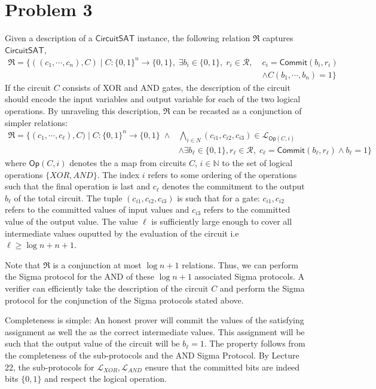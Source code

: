 \documentclass[12pt]{article}%
\begin{document}
\section*{Problem 3}
Given a description of a $\mathsf{CircuitSAT}$ instance, the following relation $\mathfrak{R}$ captures $\mathsf{CircuitSAT}$,
\begin{align*}
  \mathfrak{R} = \{ ((c_1,\cdots,c_n), C) \mid C:\{0,1\}^n \rightarrow \{0,1\}, \; \exists b_i \in \{0,1\}, \; r_i \in \mathcal{R}, \; & c_i = \mathsf{Commit}(b_i,r_i) \\
  & \wedge C(b_1,\cdots,b_n) = 1 \}
\end{align*}
If the circuit $C$ consists of XOR and AND gates, the description of the circuit should encode the input variables and output variable for each of the two logical operations. By unraveling this description, $\mathfrak{R}$ can be recasted as a conjunction of simpler relations:
\begin{align*}
  \mathfrak{R} = \{ (c_1,\cdots,c_\ell), C) \mid C:\{0,1\}^n \rightarrow \{0,1\}\;
   \wedge & \bigwedge_{i \in N} (c_{i1}, c_{i2}, c_{i3}) \in \mathcal{L}_{\mathsf{Op}(C, i)} \\
    & \wedge \exists b_\ell \in \{0,1\}, r_\ell \in \mathcal{R}, \; c_\ell = \mathsf{Commit}(b_\ell, r_\ell) \wedge b_\ell = 1 \}
\end{align*}
where $\mathsf{Op}(C, i)$ denotes the a map from circuits $C$, $i \in \mathbb{N}$ to the set of logical operations $\{XOR, AND\}$. The index $i$ refers to some ordering of the operations such that the final operation is last and $c_\ell$ denotes the commitment to the output $b_\ell$ of the total circuit. The tuple $(c_{i1}, c_{i2}, c_{i3})$ is such that for a gate: $c_{i1}, c_{i2}$ refers to the committed values of input values and $c_{i3}$ refers to the committed value of the output value. The value $\ell$ is sufficiently large enough to cover all intermediate values ouputted by the evaluation of the circuit i.e $\ell \geq \log{n} + n + 1$.  \newline

\noindent Note that $\mathfrak{R}$ is a conjunction at most $\log{n} + 1$ relations. Thus, we can perform the Sigma protocol for the AND of these $\log{n} + 1$ associated Sigma protocols. A verifier can efficiently take the description of the circuit $C$ and perform the Sigma protocol for the conjunction of the Sigma protocols stated above. \newline

\noindent Completeness is simple: An honest prover will commit the values of the satisfying assignment as well the as the correct intermediate values. This assignment will be such that the output value of the circuit will be $b_\ell = 1$. The property follows from the completeness of the sub-protocols and the AND Sigma Protocol. By Lecture 22, the sub-protocols for $\mathcal{L}_{XOR},\mathcal{L}_{AND}$ ensure that the committed bits are indeed bits $\{0,1\}$ and respect the logical operation. \newline
\end{document}
